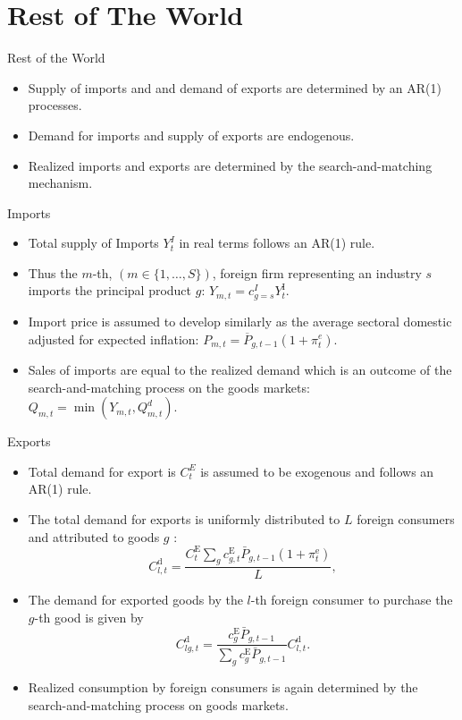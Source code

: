 \documentclass[9pt]{beamer}
\begin{document}
\section{Rest of The World}
\begin{frame}{Rest of the World}
\label{Imports}
    \begin{itemize}
        \item Supply of imports and and demand of exports are determined by an AR(1) processes.
        \item Demand for imports and supply of exports are endogenous.
        \item Realized imports and exports are determined by the search-and-matching mechanism.
    \end{itemize}
    \hyperlink{ReturnOverview}{}
\end{frame}
\begin{frame}{Imports}
    \begin{itemize}
        \item Total supply of Imports $Y^I_t$ in real terms follows an AR(1) rule.
        \item Thus the $m$-th, $(m\in\{1, \ldots, S\})$, foreign firm representing an industry $s$ imports the principal product $g$: $    Y_{m,t}=c_{g=s}^I Y^{\mathrm{I}}_t.$
        \item  Import price is assumed to develop similarly as the average sectoral domestic adjusted for expected inflation: $P_{m,t}=\overline{P}_{g,t-1} (1+\pi^e_t)$.
        \item Sales of imports are equal to the realized demand which is an outcome of the search-and-matching process on the goods markets: $Q_{m,t}=\min \left(Y_{m,t}, Q_{m,t}^d\right)$.
    \end{itemize}
                    \hyperlink{ReturnOverview}{}
\end{frame}
\begin{frame}{Exports}
    \begin{itemize}
        \item Total demand for export is $C^E_t$ is assumed to be exogenous and follows an AR(1) rule.
        \item  The total demand for exports is uniformly distributed to $L$ foreign consumers and attributed to goods $g$ :
\begin{equation}
    C_{l,t}^{\mathrm{d}}=\frac{C^{\mathrm{E}}_t \sum_g c_{g,t}^{\mathrm{E}} \bar{P}_{g,t-1}\left(1+\pi^{\mathrm{e}}_t\right)}{L},
\end{equation}
\item The demand for exported goods by the $l$-th foreign consumer to purchase the $g$-th good is given by
\begin{equation}
    C_{l g,t}^{\mathrm{d}}=\frac{c_g^{\mathrm{E}} \bar{P}_{g,t-1}}{\sum_g c_g^{\mathrm{E}} \bar{P}_{g,t-1}} C_{l,t}^{\mathrm{d}}.
\end{equation}
\item Realized consumption by foreign consumers is again determined by the search-and-matching process on goods
markets.
    \end{itemize}
                    \hyperlink{ReturnOverview}{}
\end{frame}
\end{document}
